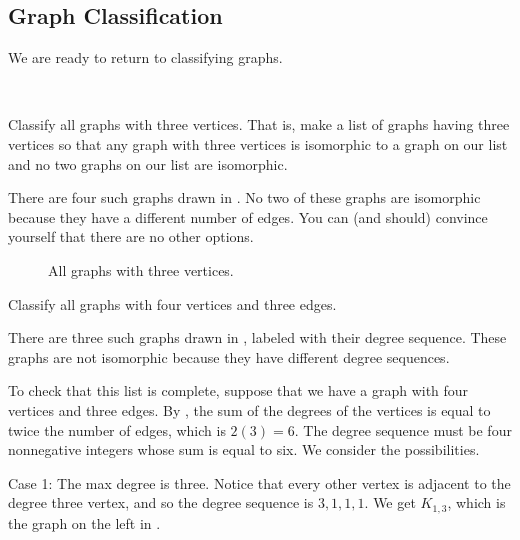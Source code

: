 
\newcommand{\subgraphclassification}{Graph Classification}
\subsection{\subgraphclassification}
\label{sub_graph_classification}

We are ready to return to classifying graphs.

\begin{exam}
\label{exam_classify_order3_order4}
~
    \begin{apart}
        \item Classify all graphs with three vertices. That is, make a list of graphs having three vertices so that any graph with three vertices is isomorphic to a graph on our list and no two graphs on our list are isomorphic.
             \begin{soln}
                There are four such graphs drawn in . No two of these graphs are isomorphic because they have a different number of edges. You can (and should) convince yourself that there are no other options.
            \end{soln}

            \begin{figure}[hbtp]
                \centering
                
                \caption{All graphs with three vertices.}
                \label{fig_classify_order3}
            \end{figure}
        \item Classify all graphs with four vertices and three edges.
            \begin{soln}
                There are three such graphs drawn in , labeled with their degree sequence. These graphs are not isomorphic because they have different degree sequences. 
            
                To check that this list is complete, suppose that we have a graph with four vertices and three edges.  By , the sum of the degrees of the vertices is equal to twice the number of edges, which is $2(3)=6$.  The degree sequence must be four nonnegative integers whose sum is equal to six.  We consider the possibilities.
                
                Case 1: The max degree is three.  Notice that every other vertex is adjacent to the degree three vertex, and so the degree sequence is $3,1,1,1$.  We get $K_{1,3}$, which is the graph on the left in .


\end{soln}
\end{apart}
\end{exam}
